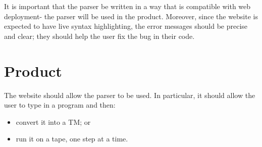 It is important that the parser be written in a way that is compatible with web deployment- the parser will be used in the product. Moreover, since the website is expected to have live syntax highlighting, the error messages should be precise and clear; they should help the user fix the bug in their code.

\section{Product}
The website should allow the parser to be used. In particular, it should allow the user to type in a program and then:
\begin{itemize}
    \item convert it into a TM; or
    \item run it on a tape, one step at a time.
\end{itemize}
